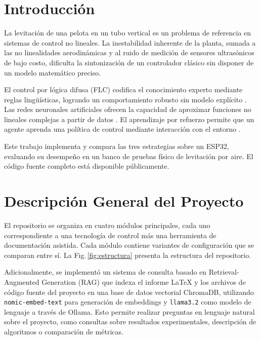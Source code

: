 \documentclass[conference]{IEEEtran}
\begin{document}
\section{Introducción}
\label{sec:intro}

La levitación de una pelota en un tubo vertical es un problema de referencia en sistemas de control no lineales. La inestabilidad inherente de la planta, sumada a las no linealidades aerodinámicas y al ruido de medición de sensores ultrasónicos de bajo costo, dificulta la sintonización de un controlador clásico sin disponer de un modelo matemático preciso.

El control por lógica difusa (FLC) codifica el conocimiento experto mediante reglas lingüísticas, logrando un comportamiento robusto sin modelo explícito \cite{zadeh1965}. Las redes neuronales artificiales ofrecen la capacidad de aproximar funciones no lineales complejas a partir de datos \cite{rumelhart1986}. El aprendizaje por refuerzo permite que un agente aprenda una política de control mediante interacción con el entorno \cite{sutton1998}.

Este trabajo implementa y compara las tres estrategias sobre un ESP32, evaluando su desempeño en un banco de pruebas físico de levitación por aire. El código fuente completo está disponible públicamente.

\section{Descripción General del Proyecto}

El repositorio se organiza en cuatro módulos principales, cada uno correspondiente a una tecnología de control más una herramienta de documentación asistida. Cada módulo contiene variantes de configuración que se comparan entre sí. La Fig.\,\ref{fig:estructura} presenta la estructura del repositorio.

Adicionalmente, se implementó un sistema de consulta basado en Retrieval-Augmented Generation (RAG) que indexa el informe \LaTeX{} y los archivos de código fuente del proyecto en una base de datos vectorial ChromaDB, utilizando \texttt{nomic-embed-text} para generación de embeddings y \texttt{llama3.2} como modelo de lenguaje a través de Ollama. Esto permite realizar preguntas en lenguaje natural sobre el proyecto, como consultas sobre resultados experimentales, descripción de algoritmos o comparación de métricas.
\end{document}
